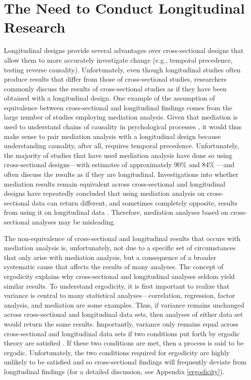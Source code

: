 \documentclass[
12pt, %
twoside,
english]{guelphthesis}
\begin{document}
\hypertarget{the-need-to-conduct-longitudinal-research}{%
\section{The Need to Conduct Longitudinal Research}\label{the-need-to-conduct-longitudinal-research}}

Longitudinal designs provide several advantages over cross-sectional designs that allow them to more accurately investigate change (e.g., temporal precedence, testing reverse causality). Unfortunately, even though longitudinal studies often produce results that differ from those of cross-sectional studies, researchers commonly discuss the results of cross-sectional studies as if they have been obtained with a longitudinal design. One example of the assumption of equivalence between cross-sectional and longitudinal findings comes from the large number of studies employing mediation analysis. Given that mediation is used to understand chains of causality in psychological processes \autocite{baron1986}, it would thus make sense to pair mediation analysis with a longitudinal design because understanding causality, after all, requires temporal precedence. Unfortunately, the majority of studies that have used mediation analysis have done so using cross-sectional designs---with estimates of approximately 90\% \autocite{maxwell2007} and 84\% \autocite{mitchell2013}---and often discuss the results as if they are longitudinal. Investigations into whether mediation results remain equivalent across cross-sectional and longitudinal designs have repeatedly concluded that using mediation analysis on cross-sectional data can return different, and sometimes completely opposite, results from using it on longitudinal data \autocite{cole2003,maxwell2007,maxwell2011,mitchell2013,olaughlin2018}. Therefore, mediation analyses based on cross-sectional analyses may be misleading.

The non-equivalence of cross-sectional and longitudinal results that occurs with mediation analysis is, unfortunately, not due to a specific set of circumstances that only arise with mediation analysis, but a consequence of a broader systematic cause that affects the results of many analyses. The concept of ergodicity explains why cross-sectional and longitudinal analyses seldom yield similar results. To understand ergodicity, it is first important to realize that variance is central to many statistical analyses---correlation, regression, factor analysis, and mediation are some examples. Thus, if variance remains unchanged across cross-sectional and longitudinal data sets, then analyses of either data set would return the same results. Importantly, variance only remains equal across cross-sectional and longitudinal data sets if two conditions put forth by ergodic theory are satisfied \autocites[homogeneity and stationarity;][]{molenaar2004,molenaar2009}. If these two conditions are met, then a process is said to be ergodic. Unfortunately, the two conditions required for ergodicity are highly unlikely to be satisfied and so cross-sectional findings will frequently deviate from longitudinal findings (for a detailed discussion, see Appendix \ref{ergodicity}).
\end{document}
